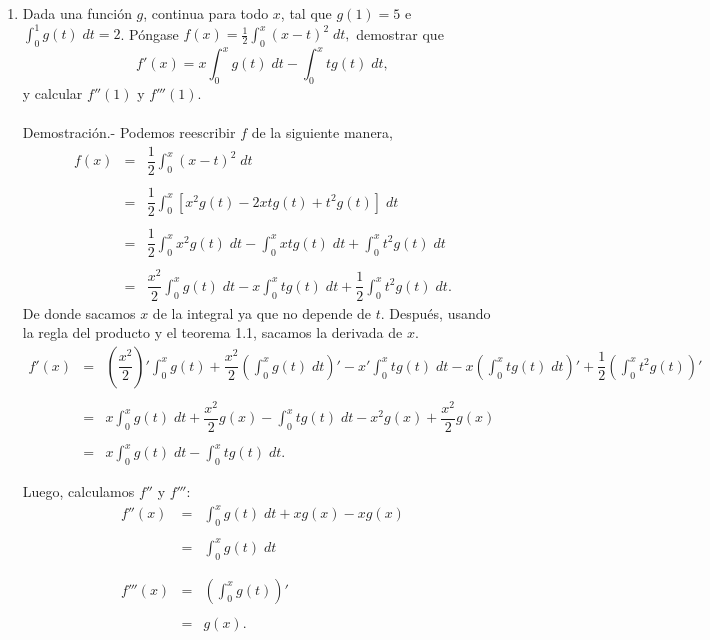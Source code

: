 \begin{enumerate}[\bfseries 1.]
    \item Dada una función $g$, continua para todo $x$, tal que $g(1)=5$ e $\int_0^1 g(t)\; dt =2$. Póngase $f(x)=\frac{1}{2}\int_0^x (x-t)^2\; dt,$ demostrar que
    $$f'(x)=x\int_0^xg(t)\; dt-\int_0^x tg(t)\; dt,$$
    y calcular $f''(1)$ y $f'''(1)$.\\\\
	Demostración.-\; Podemos reescribir $f$ de la siguiente manera,
	$$\begin{array}{rcl}
	    f(x)&=&\displaystyle\dfrac{1}{2}\int_0^x (x-t)^2\; dt\\\\
		&=&\displaystyle\dfrac{1}{2} \int_0^x\left[x^2g(t)-2xtg(t)+t^2g(t)\right]\; dt\\\\
		&=&\displaystyle\dfrac{1}{2}\int_0^x x^2g(t)\; dt-\int_0^x xtg(t)\; dt+\int_0^x t^2g(t)\; dt\\\\
		&=&\displaystyle\dfrac{x^2}{2}\int_0^x g(t)\; dt-x\int_0^x tg(t)\; dt+\dfrac{1}{2}\int_0^x t^2g(t)\; dt.
	\end{array}$$
	\vspace{0.2cm}
	De donde sacamos $x$ de la integral ya que no depende de $t$. Después, usando la regla del producto y el teorema 1.1, sacamos la derivada de $x$.\\
	$$\begin{array}{rcl}
	    f'(x)&=&\displaystyle \left(\dfrac{x^2}{2}\right)' \displaystyle \int_0^x g(t)+\dfrac{x^2}{2}\left(\int_0^x g(t)\; dt\right)' - x' \int_0^x tg(t)\; dt - x\left(\int_0^x tg(t)\; dt\right)' + \dfrac{1}{2}\left(\int_0^x t^2g(t)\right)'\\\\
		 &=&\displaystyle x\int_0^x g(t)\; dt + \dfrac{x^2}{2} g(x) - \int_0^x tg(t)\; dt - x^2 g(x) + \dfrac{x^2}{2}g(x)\\\\
		 &=&\displaystyle x\int_0^x g(t)\; dt - \int_0^x tg(t)\; dt.
	\end{array}$$
	\vspace{0.2cm}

	Luego, calculamos $f''$ y $f'''$:
	$$\begin{array}{rcl}
	    f''(x)&=&\displaystyle \int_0^x g(t)\; dt + xg(x)-xg(x)\\\\
		  &=&\displaystyle \int_0^x g(t)\; dt\\\\
		  &&\\
	    f'''(x)&=&\displaystyle\left(\int_0^x g(t)\right)'\\\\
		   &=&g(x).
	\end{array}$$
	\vspace{0.2cm}


\end{enumerate}
